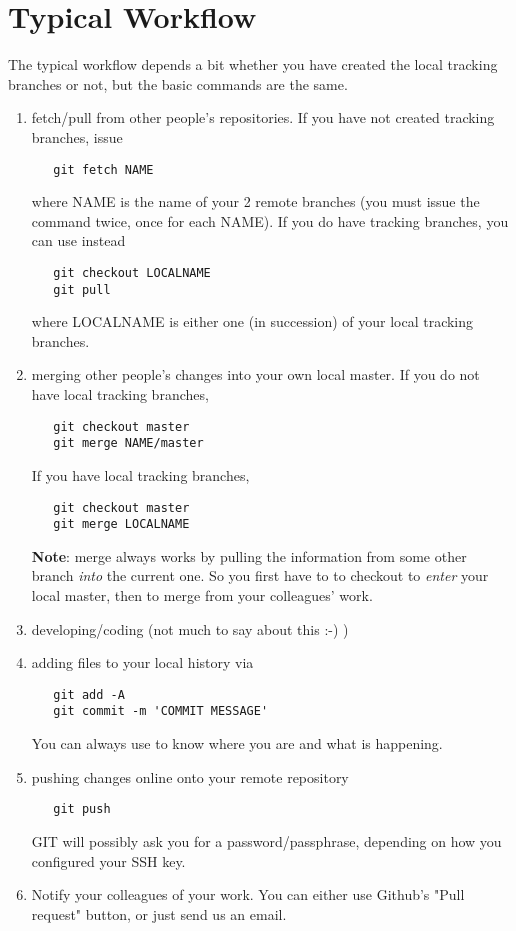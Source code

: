 \documentclass[12pt,a4paper,notitlepage,onecolumn]{article}
\begin{document}
\section{Typical Workflow}
The typical workflow depends a bit whether you have created the local tracking branches or not, but the basic commands are the same.
\begin{enumerate}
 \item fetch/pull from other people's repositories. If you have not created tracking branches, issue
  \begin{verbatim}
   git fetch NAME
  \end{verbatim}
  where NAME is the name of your 2 remote branches (you must issue the command twice, once for each NAME). If you do have tracking branches, you can use instead
  \begin{verbatim}
   git checkout LOCALNAME
   git pull
  \end{verbatim}
  where LOCALNAME is either one (in succession) of your local tracking branches.
 \item merging other people's changes into your own local master. If you do not have local tracking branches,
  \begin{verbatim}
   git checkout master
   git merge NAME/master
  \end{verbatim}
  If you have local tracking branches,
  \begin{verbatim}
   git checkout master
   git merge LOCALNAME
  \end{verbatim}
  {\bf Note}: merge always works by pulling the information from some other branch {\it into} the current one. So you first have to to checkout to {\it enter} your local master, then to merge from your colleagues' work.
 \item developing/coding (not much to say about this :-) )
 \item adding files to your local history via
  \begin{verbatim}
   git add -A
   git commit -m 'COMMIT MESSAGE'
  \end{verbatim}
  You can always use  to know where you are and what is happening.
 \item pushing changes online onto your remote repository
  \begin{verbatim}
   git push
  \end{verbatim}
  GIT will possibly ask you for a password/passphrase, depending on how you configured your SSH key.
 \item Notify your colleagues of your work. You can either use Github's "Pull request" button, or just send us an email.
\end{enumerate}
\end{document}
